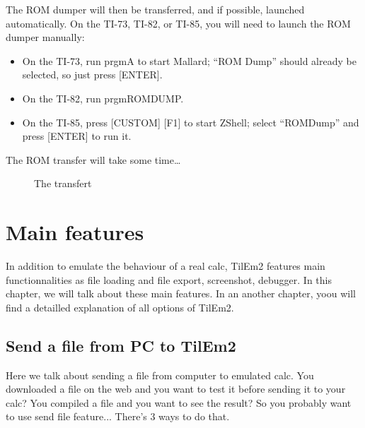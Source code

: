 \documentclass[10pt]{report}
\newcommand{\calckey}[1]{\textsf{[#1]}}
\begin{document}
The ROM dumper will then be transferred, and if possible, launched
automatically.  On the TI-73, TI-82, or TI-85, you will need to launch
the ROM dumper manually:
\begin{itemize}
\item On the TI-73, run \textsf{prgmA} to start Mallard; ``ROM Dump''
  should already be selected, so just press \calckey{ENTER}.
\item On the TI-82, run \textsf{prgmROMDUMP}.
\item On the TI-85, press \calckey{CUSTOM} \calckey{F1} to start
  ZShell; select ``ROMDump'' and press \calckey{ENTER} to run it.
\end{itemize}

The ROM transfer will take some time\dots
\begin{figure}[H]
\centering
{}
\caption{The transfert}
\end{figure}

\chapter{Main features}

In addition to emulate the behaviour of a real calc, TilEm2 features main functionnalities as file loading and file export, screenshot, debugger.\newline
In this chapter, we will talk about these main features.\newline
In an another chapter, yoou will find a detailled explanation of all options of TilEm2.\newline

\section{Send a file from PC to TilEm2}

Here we talk about sending a file from computer to emulated calc.\newline
You downloaded a file on the web and you want to test it before sending it to your calc?\newline
You compiled a file and you want to see the result?\newline
So you probably want to use send file feature...\newline\newline
There's 3 ways to do that.\newline
\end{document}
